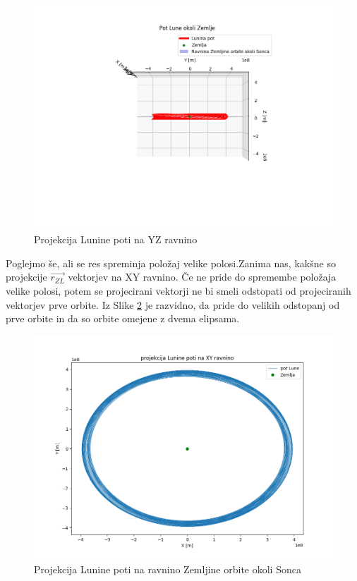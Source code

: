 \documentclass[titlepage,12pt,a4paper]{article}
\begin{document}
\begin{figure}[H]
\begin{center}
\includegraphics[scale=0.65]{Slike/Orbita_Lune_YZravnina.png}
\caption{Projekcija Lunine poti na YZ ravnino}
\label{orb . Luna YZ}
\end{center}
\end{figure}

Poglejmo še, ali se res spreminja položaj velike polosi.Zanima nas, kakšne so projekcije $\overrightarrow{r_{ZL}}$ vektorjev na XY ravnino. Če ne pride do spremembe položaja velike polosi, potem se projecirani vektorji ne bi smeli odstopati od projeciranih vektorjev prve orbite. Iz Slike \ref{orb. Luna XY} je razvidno, da pride do velikih odstopanj od prve orbite in da so orbite omejene z dvema elipsama.
\begin{figure}[H]
\begin{center}
	\includegraphics[scale=0.6]{Slike/Orbita_Lune_XYravnina}
	\caption{Projekcija Lunine poti na ravnino Zemljine orbite okoli Sonca}
	\label{orb. Luna XY}
\end{center}
\end{figure}
\end{document}
